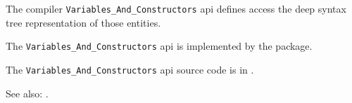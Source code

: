 
The compiler {\tt Variables\_And\_Constructors} api defines access the deep syntax 
tree representation of those entities.

The {\tt Variables\_And\_Constructors} api is implemented by the  package.

The {\tt Variables\_And\_Constructors} api source code is in .

See also:  .

